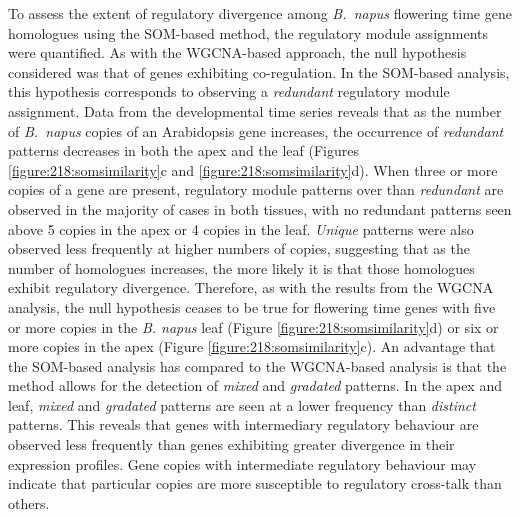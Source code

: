 \documentclass[12pt,]{book}
\begin{document}
To assess the extent of regulatory divergence among \emph{B.~napus}
flowering time gene homologues using the SOM-based method, the
regulatory module assignments were quantified. As with the WGCNA-based
approach, the null hypothesis considered was that of genes exhibiting
co-regulation. In the SOM-based analysis, this hypothesis corresponds to
observing a \emph{redundant} regulatory module assignment. Data from the
developmental time series reveals that as the number of \emph{B.~napus}
copies of an Arabidopsis gene increases, the occurrence of
\emph{redundant} patterns decreases in both the apex and the leaf
(Figures \ref{figure:218:somsimilarity}c and
\ref{figure:218:somsimilarity}d). When three or more copies of a gene
are present, regulatory module patterns over than \emph{redundant} are
observed in the majority of cases in both tissues, with no redundant
patterns seen above 5 copies in the apex or 4 copies in the leaf.
\emph{Unique} patterns were also observed less frequently at higher
numbers of copies, suggesting that as the number of homologues
increases, the more likely it is that those homologues exhibit
regulatory divergence. Therefore, as with the results from the WGCNA
analysis, the null hypothesis ceases to be true for flowering time genes
with five or more copies in the \emph{B. napus} leaf (Figure
\ref{figure:218:somsimilarity}d) or six or more copies in the apex
(Figure \ref{figure:218:somsimilarity}c). An advantage that the
SOM-based analysis has compared to the WGCNA-based analysis is that the
method allows for the detection of \emph{mixed} and \emph{gradated}
patterns. In the apex and leaf, \emph{mixed} and \emph{gradated}
patterns are seen at a lower frequency than \emph{distinct} patterns.
This reveals that genes with intermediary regulatory behaviour are
observed less frequently than genes exhibiting greater divergence in
their expression profiles. Gene copies with intermediate regulatory
behaviour may indicate that particular copies are more susceptible to
regulatory cross-talk than others.
\end{document}
